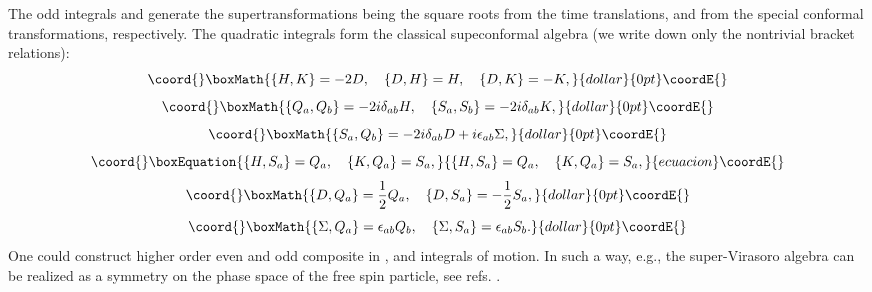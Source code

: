 \documentclass[a4paper,12pt]{article}
\begin{document}
The odd integrals \coordHE{} and \coordHE{}
generate the
supertransformations
being the square roots from the time translations,
and from the special conformal transformations,
respectively.
The quadratic integrals form the classical
supeconformal algebra \coordHE{}
(we write down only the nontrivial bracket relations):
$$\coord{}\boxMath{
\{H,K\}=-2D,\quad
\{D,H\}=H,\quad
\{D,K\}=-K,
}{dollar}{0pt}\coordE{}$$  $$\coord{}\boxMath{
\{Q_a,Q_b\}=-2i\delta_{ab}H,\quad
\{S_a,S_b\}=-2i\delta_{ab}K,
}{dollar}{0pt}\coordE{}$$  $$\coord{}\boxMath{
\{S_a,Q_b\}=-2i\delta_{ab}D+i\epsilon_{ab}\Sigma,
}{dollar}{0pt}\coordE{}$$
\begin{equation}\coord{}\boxEquation{
\{H,S_a\}=Q_a,\quad
\{K,Q_a\}=S_a,
\label{scon0}
}{
\{H,S_a\}=Q_a,\quad
\{K,Q_a\}=S_a,
}{ecuacion}\coordE{}\end{equation}
$$\coord{}\boxMath{
\{D,Q_a\}=\frac{1}{2}Q_a,\quad
\{D,S_a\}=-\frac{1}{2}S_a,
}{dollar}{0pt}\coordE{}$$  $$\coord{}\boxMath{
\{\Sigma,Q_a\}=\epsilon_{ab}Q_b,\quad
\{\Sigma,S_a\}=\epsilon_{ab}S_b.
}{dollar}{0pt}\coordE{}$$
One could construct higher order even and odd
composite in  \coordHE{}, \coordHE{} and \myHighlight{$\psi^\pm$}\coordHE{}
integrals of motion.
In such a way, e.g.,
the super-Virasoro algebra
can be realized as a symmetry
on the phase space
of the free spin particle, see refs. \cite{Kum,CKZ}.
\end{document}
